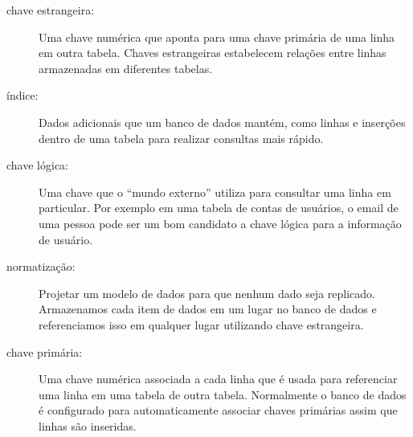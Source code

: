 \begin{description}
\item[chave estrangeira:] Uma chave numérica que aponta para uma chave primária
  de uma linha em outra tabela. Chaves estrangeiras estabelecem relações entre
  linhas armazenadas em diferentes tabelas.
  

\item[índice:] Dados adicionais que um banco de dados mantém, como linhas e
  inserções dentro de uma tabela para realizar consultas mais rápido.
  

\item[chave lógica:] Uma chave que o ``mundo externo'' utiliza para consultar
  uma linha em particular. Por exemplo em uma tabela de contas de usuários, o
  email de uma pessoa pode ser um bom candidato a chave lógica para a
  informação de usuário.
  

\item[normatização:] Projetar um modelo de dados para que nenhum dado seja
  replicado. Armazenamos cada item de dados em um lugar no banco de dados
  e referenciamos isso em qualquer lugar utilizando chave estrangeira.
  

\item[chave primária:] Uma chave numérica associada a cada linha que é usada
  para referenciar uma linha em uma tabela de outra tabela. Normalmente o
  banco de dados é configurado para automaticamente associar chaves primárias
  assim que linhas são inseridas.
  

\end{description}
